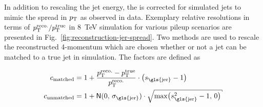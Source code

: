 
In addition to rescaling the jet energy, the  is corrected for simulated jets to mimic the spread in $p_\mathrm{T}$ as observed in data. Exemplary relative resolutions in terms of $p_\mathrm{T}^\mathrm{reco.}/p_\mathrm{T}^\mathrm{true}$ in 8~TeV simulation for various pileup scenarios are presented in Fig.~\ref{fig:reconstruction-jer-spread}. Two methods are used to rescale the reconstructed 4-momentum which are chosen whether or not a jet can be matched to a true jet in simulation. The factors are defined as

\begin{align}
c_\mathrm{matched}&=1+\frac{\pt^\mathrm{reco.}-\pt^\mathrm{true}}{\pt^\mathrm{reco.}}\cdot\big(s_\mathrm{\gls{jer}}-1\big)\\ c_\mathrm{unmatched}&=1+\mathsf{N}(0,\,\sigma_\mathrm{\gls{jer}})\cdot\sqrt{\mathrm{max}\big(s_\mathrm{\gls{jer}}^2-1,\,0\big)}
\end{align}

